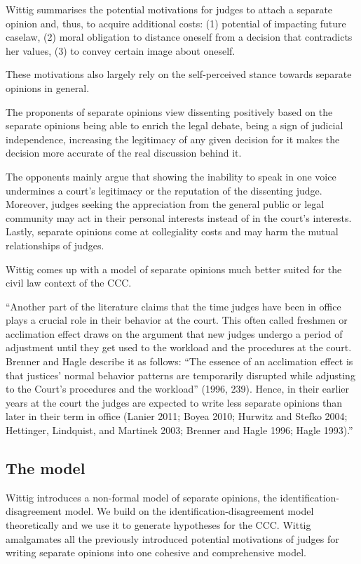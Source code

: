 \documentclass[
  11pt,
]{article}
\begin{document}
Wittig summarises the potential motivations for judges to attach a
separate opinion and, thus, to acquire additional costs: (1) potential
of impacting future caselaw, (2) moral obligation to distance oneself
from a decision that contradicts her values, (3) to convey certain image
about oneself.

These motivations also largely rely on the self-perceived stance towards
separate opinions in general.

The proponents of separate opinions view dissenting positively based on
the separate opinions being able to enrich the legal debate, being a
sign of judicial independence, increasing the legitimacy of any given
decision for it makes the decision more accurate of the real discussion
behind it.

The opponents mainly argue that showing the inability to speak in one
voice undermines a court's legitimacy or the reputation of the
dissenting judge. Moreover, judges seeking the appreciation from the
general public or legal community may act in their personal interests
instead of in the court's interests. Lastly, separate opinions come at
collegiality costs and may harm the mutual relationships of judges.

Wittig comes up with a model of separate opinions much better suited for
the civil law context of the CCC.

``Another part of the literature claims that the time judges have been
in office plays a crucial role in their behavior at the court. This
often called freshmen or acclimation effect draws on the argument that
new judges undergo a period of adjustment until they get used to the
workload and the procedures at the court. Brenner and Hagle describe it
as follows: ``The essence of an acclimation effect is that justices'
normal behavior patterns are temporarily disrupted while adjusting to
the Court's procedures and the workload'' (1996, 239). Hence, in their
earlier years at the court the judges are expected to write less
separate opinions than later in their term in office (Lanier 2011; Boyea
2010; Hurwitz and Stefko 2004; Hettinger, Lindquist, and Martinek 2003;
Brenner and Hagle 1996; Hagle 1993).''

\hypertarget{the-model}{%
\subsection{The model}\label{the-model}}

Wittig introduces a non-formal model of separate opinions, the
identification-disagreement model. We build on the
identification-disagreement model theoretically and we use it to
generate hypotheses for the CCC. Wittig amalgamates all the previously
introduced potential motivations of judges for writing separate opinions
into one cohesive and comprehensive model.
\end{document}
